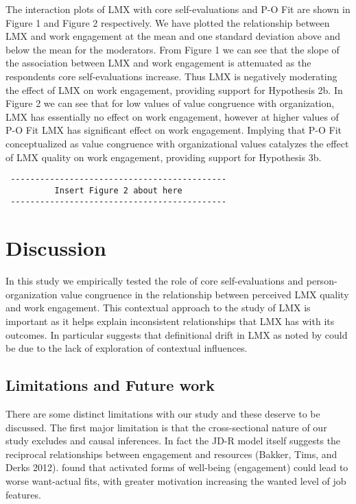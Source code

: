 The interaction plots of LMX with core self-evaluations and P-O Fit are
shown in Figure 1 and Figure 2 respectively. We have plotted the
relationship between LMX and work engagement at the mean and one
standard deviation above and below the mean for the moderators. From
Figure 1 we can see that the slope of the association between LMX and
work engagement is attenuated as the respondents core self-evaluations
increase. Thus LMX is negatively moderating the effect of LMX on work
engagement, providing support for Hypothesis 2b. In Figure 2 we can see
that for low values of value congruence with organization, LMX has
essentially no effect on work engagement, however at higher values of
P-O Fit LMX has significant effect on work engagement. Implying that P-O
Fit conceptualized as value congruence with organizational values
catalyzes the effect of LMX quality on work engagement, providing
support for Hypothesis 3b.

\begin{verbatim}
 --------------------------------------------
          Insert Figure 2 about here
 --------------------------------------------
\end{verbatim}

\section{Discussion}\label{discussion}

In this study we empirically tested the role of core self-evaluations
and person-organization value congruence in the relationship between
perceived LMX quality and work engagement. This contextual approach to
the study of LMX is important as it helps explain inconsistent
relationships that LMX has with its outcomes. In particular suggests
that definitional drift in LMX as noted by could be due to the lack of
exploration of contextual influences.

\subsection{Limitations and Future
work}\label{limitations-and-future-work}

There are some distinct limitations with our study and these deserve to
be discussed. The first major limitation is that the cross-sectional
nature of our study excludes and causal inferences. In fact the JD-R
model itself suggests the reciprocal relationships between engagement
and resources (Bakker, Tims, and Derks 2012). found that activated forms
of well-being (engagement) could lead to worse want-actual fits, with
greater motivation increasing the wanted level of job features.

